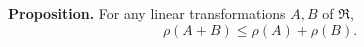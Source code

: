 \textbf{Proposition.} For any linear transformations $A, B$ of $\mathfrak{R}$,
$$\rho(A + B) \leq \rho(A) + \rho(B).$$
